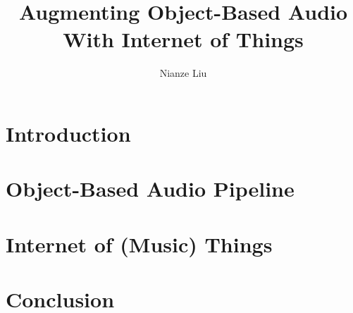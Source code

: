 \documentclass[jou]{apa6}
\title{Augmenting Object-Based Audio With Internet of Things}
\author{Nianze Liu}
\affiliation{New York University}
\begin{document}
\maketitle

\section{Introduction}

\section{Object-Based Audio Pipeline}

\section{Internet of (Music) Things}

\section{Conclusion}

\printbibliography
\end{document}
